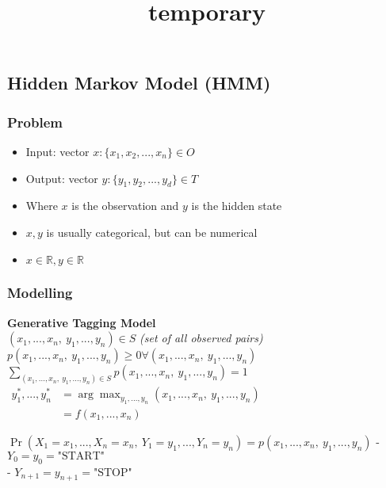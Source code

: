 \documentclass[11pt]{article}
\title{temporary}
\providecommand{\tightlist}{%
      \setlength{\itemsep}{0pt}\setlength{\parskip}{0pt}}
\begin{document}
    
    
    \maketitle
    
    

    
    \hypertarget{hidden-markov-model-hmm}{%
\subsection{Hidden Markov Model (HMM)}\label{hidden-markov-model-hmm}}

\hypertarget{problem}{%
\subsubsection{Problem}\label{problem}}

\begin{itemize}
\tightlist
\item
  Input: vector \(x:\{x_1,x_2,...,x_n\}\in O\)
\item
  Output: vector \(y:\{y_1,y_2,...,y_d\}\in T\)
\item
  Where \(x\) is the observation and \(y\) is the hidden state
\item
  \(x,y\) is usually categorical, but can be numerical
\item
  \(x\in\mathbb R,y\in\mathbb R\)
\end{itemize}

\hypertarget{modelling}{%
\subsubsection{Modelling}\label{modelling}}

\textbf{Generative Tagging Model}\\
\((x_1,...,x_n,\ y_1,...,y_n)\in S\) \emph{(set of all observed pairs)}
\(p(x_1,...,x_n,\ y_1,...,y_n)\geq0\forall(x_1,...,x_n,\ y_1,...,y_n)\)
\(\sum_{(x_1,...,x_n,\ y_1,...,y_n)\in S}p(x_1,...,x_n,\ y_1,...,y_n)=1\)\\
\(\begin{aligned}y_1^*,...,y_n^*&=\arg\max_{y_1,...,y_n}(x_1,...,x_n,\ y_1,...,y_n)\\&=f(x_1,...,x_n)\end{aligned}\)

\(\Pr(X_1=x_1,...,X_n=x_n,\ Y_1=y_1,...,Y_n=y_n)=p(x_1,...,x_n,\ y_1,...,y_n)\)
- \(Y_0=y_0=\text{"START"}\)\\
- \(Y_{n+1}=y_{n+1}=\text{"STOP"}\)
\end{document}
